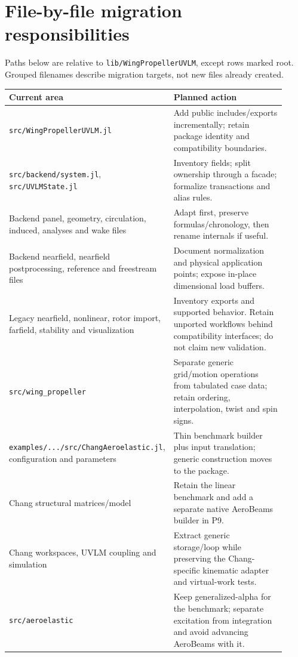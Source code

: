 \documentclass[11pt,a4paper]{article}
\newcommand{\code}{\nolinkurl}
\begin{document}
\section{File-by-file migration responsibilities}

Paths below are relative to \code{lib/WingPropellerUVLM}, except rows marked
root. Grouped filenames describe migration targets, not new files already
created.

\begingroup\small
\begin{longtable}{@{}L{0.38\linewidth}L{0.54\linewidth}@{}}
\toprule
Current area & Planned action\\
\midrule\endhead
\code{src/WingPropellerUVLM.jl} & Add public includes/exports incrementally;
retain package identity and compatibility boundaries.\\
\code{src/backend/system.jl}, \code{src/UVLMState.jl} & Inventory fields;
split ownership through a facade; formalize transactions and alias rules.\\
Backend panel, geometry, circulation, induced, analyses and wake files &
Adapt first, preserve formulas/chronology, then rename internals if useful.\\
Backend nearfield, nearfield postprocessing, reference and freestream files &
Document normalization and physical application points; expose in-place
dimensional load buffers.\\
Legacy nearfield, nonlinear, rotor import, farfield, stability and visualization &
Inventory exports and supported behavior. Retain unported workflows behind
compatibility interfaces; do not claim new validation.\\
\code{src/wing_propeller} & Separate generic grid/motion operations from
tabulated case data; retain ordering, interpolation, twist and spin signs.\\
\code{examples/.../src/ChangAeroelastic.jl}, configuration and parameters &
Thin benchmark builder plus input translation; generic construction moves
to the package.\\
Chang structural matrices/model & Retain the linear benchmark and add a
separate native AeroBeams builder in P9.\\
Chang workspaces, UVLM coupling and simulation & Extract generic storage/loop
while preserving the Chang-specific kinematic adapter and virtual-work tests.\\
\code{src/aeroelastic} & Keep generalized-alpha for the benchmark; separate
excitation from integration and avoid advancing AeroBeams with it.\\

\end{longtable}
\end{document}
